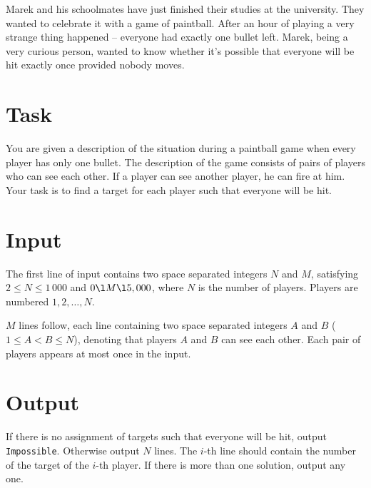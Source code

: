 Marek and his schoolmates have just finished their studies at the university.
They wanted to celebrate it with a game of paintball.
After an hour of playing a very strange thing happened -- everyone had exactly one bullet left.
Marek, being a very curious person, wanted to know whether it's possible that everyone will be hit exactly once provided nobody moves.

\section*{Task}
You are given a description of the situation during a paintball game when every player has only one bullet. The
description of the game consists of pairs of players who can see each other. If a player can see another player, he
can fire at him. Your task is to find a target for each player such that everyone will be hit.

\section*{Input}
The first line of input contains two space separated integers $N$ and $M$, satisfying $2 \le N \le 1\,000$ and $0 \l M \l 5,000$, where $N$ is the number of players.
Players are numbered $1, 2, \dots, N$.

$M$ lines follow, each line containing two space separated integers $A$ and $B$ ($1 \le A < B \le N$), denoting that players $A$ and $B$ can see each other.
Each pair of players appears at most once in the input.

\section*{Output}
If there is no assignment of targets such that everyone will be hit, output \texttt{Impossible}.
Otherwise output $N$ lines.
The $i$-th line should contain the number of the target of the $i$-th player.
If there is more than one solution, output any one.
